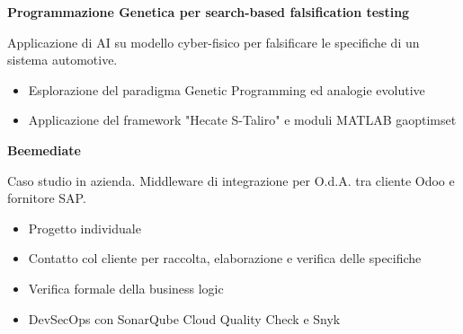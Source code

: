\documentclass[a4paper]{letter}
\begin{document}
\begin{minipage}[t]{0.65\textwidth}
\vspace{1 mm}
{\large \textbf{Programmazione Genetica per search-based falsification testing}}

{\small Applicazione di AI su modello cyber-fisico per falsificare le specifiche di un sistema automotive. }

\vspace{1 mm}
\begin{itemize}
    \item Esplorazione del paradigma Genetic Programming ed analogie evolutive
    \item Applicazione del framework "Hecate S-Taliro" e moduli MATLAB gaoptimset
\end{itemize}

\vspace{1 mm}
{\large \textbf{Beemediate}}

{\small Caso studio in azienda. Middleware di integrazione per O.d.A. tra cliente Odoo e fornitore SAP.}

\vspace{1 mm}
\begin{itemize}
    \item Progetto individuale
    \item Contatto col cliente per raccolta, elaborazione e verifica delle specifiche
    \item Verifica formale della business logic
    \item DevSecOps con SonarQube Cloud Quality Check e Snyk
\end{itemize}

\end{minipage}
\end{document}
